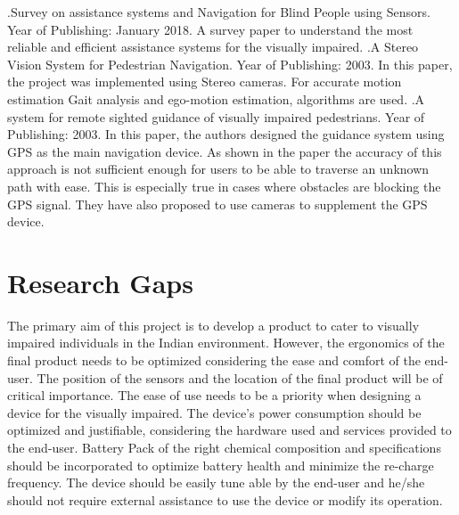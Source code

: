 \documentclass[conference]{IEEEtran}
\begin{document}
\newline[4].Survey on assistance systems and Navigation for Blind People using Sensors. Year of Publishing: January 2018. \newline
\newline A survey paper to understand the most reliable and efficient assistance systems for the visually impaired. \newline
\newline[5].A Stereo Vision System for Pedestrian Navigation. Year of Publishing: 2003. \newline
\newline In this paper, the project was implemented using Stereo cameras. For accurate motion estimation Gait analysis and ego-motion estimation, algorithms are used. \newline
\newline[6].A system for remote sighted guidance of visually impaired pedestrians. Year of Publishing: 2003. \newline
\newline In this paper, the authors designed the guidance system using GPS as the main navigation device. As shown in the paper the accuracy of this approach is not sufficient enough for users to be able to traverse an unknown path with ease. This is especially true in cases where obstacles are blocking the GPS signal. They have also proposed to use cameras to supplement the GPS device.


\section{Research Gaps}
The primary aim of this project is to develop a product to cater to visually impaired individuals in the Indian environment. However, the ergonomics of the final product needs to be optimized considering the ease and comfort of the end-user. The position of the sensors and the location of the final product will be of critical importance. The ease of use needs to be a priority when designing a device for the visually impaired. The device's power consumption should be optimized and justifiable, considering the hardware used and services provided to the end-user. Battery Pack of the right chemical composition and specifications should be incorporated to optimize battery health and minimize the re-charge frequency. The device should be easily tune able by the end-user and he/she should not require external assistance to use the device or modify its operation.\newline
\end{document}
